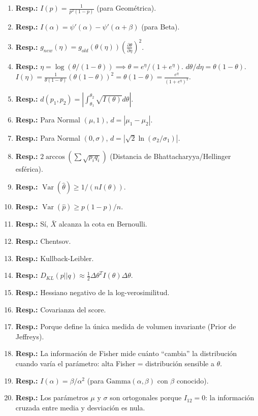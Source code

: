 \begin{enumerate}
	\item \textbf{Resp.:} $I(p) = \frac{1}{p^2(1-p)}$ (para Geométrica).
	\item \textbf{Resp.:} $I(\alpha) = \psi'(\alpha) - \psi'(\alpha+\beta)$ (para Beta).
	\item \textbf{Resp.:} $g_{new}(\eta) = g_{old}(\theta(\eta)) (\frac{\partial \theta}{\partial \eta})^2$.
	\item \textbf{Resp.:} $\eta = \log(\theta/(1-\theta)) \implies \theta = e^\eta/(1+e^\eta)$. $d\theta/d\eta = \theta(1-\theta)$. $I(\eta) = \frac{1}{\theta(1-\theta)} (\theta(1-\theta))^2 = \theta(1-\theta) = \frac{e^\eta}{(1+e^\eta)^2}$.
	\item \textbf{Resp.:} $d(p_1, p_2) = |\int_{\theta_1}^{\theta_2} \sqrt{I(\theta)} d\theta|$.
	\item \textbf{Resp.:} Para Normal $(\mu, 1)$, $d = |\mu_1 - \mu_2|$.
	\item \textbf{Resp.:} Para Normal $(0, \sigma)$, $d = |\sqrt{2}\ln(\sigma_2/\sigma_1)|$.
	\item \textbf{Resp.:} $2\arccos(\sum \sqrt{p_i q_i})$ (Distancia de Bhattacharyya/Hellinger esférica).
	\item \textbf{Resp.:} $\operatorname{Var}(\hat\theta) \ge 1/(n I(\theta))$.
	\item \textbf{Resp.:} $\operatorname{Var}(\hat p) \ge p(1-p)/n$.
	\item \textbf{Resp.:} Sí, $\bar X$ alcanza la cota en Bernoulli.
	\item \textbf{Resp.:} Chentsov.
	\item \textbf{Resp.:} Kullback-Leibler.
	\item \textbf{Resp.:} $D_{KL}(p||q) \approx \frac{1}{2} \Delta\theta^T I(\theta) \Delta\theta$.
	\item \textbf{Resp.:} Hessiano negativo de la log-verosimilitud.
	\item \textbf{Resp.:} Covarianza del score.
	\item \textbf{Resp.:} Porque define la única medida de volumen invariante (Prior de Jeffreys).
	\item \textbf{Resp.:} La información de Fisher mide cuánto ``cambia'' la distribución cuando varía el parámetro: alta Fisher = distribución sensible a $\theta$.
	\item \textbf{Resp.:} $I(\alpha) = \beta/\alpha^2$ (para $\mathrm{Gamma}(\alpha,\beta)$ con $\beta$ conocido).
	\item \textbf{Resp.:} Los parámetros $\mu$ y $\sigma$ son ortogonales porque $I_{12} = 0$: la información cruzada entre media y desviación es nula.

\end{enumerate}
